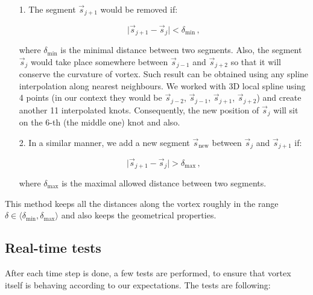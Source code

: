 \begin{itemize}
	\item[1.] The segment $\vec{s}_{j+1}$ would be removed if:

	\begin{equation}
	\vert \vec{s}_{j+1} - \vec{s}_j \vert < \delta_{\text{min}}\,,
	\end{equation}

	where $\delta_{\text{min}}$ is the minimal distance between two segments. Also, the segment $\vec{s}_j$ would take place somewhere between $\vec{s}_{j-1}$ and $\vec{s}_{j+2}$ so that it will conserve the curvature of vortex. Such result can be obtained using any spline interpolation along nearest neighbours. We worked with 3D local spline using 4 points (in our context they would be $\vec{s}_{j-2}$, $\vec{s}_{j-1}$, $\vec{s}_{j+1}$, $\vec{s}_{j+2}$) and create another 11 interpolated knots.
	Consequently, the new position of $\vec{s}_j$ will sit on the 6-th (the middle one) knot and also.

	\item[2.] In a similar manner, we add a new segment $\vec{s}_{\text{new}}$ between $\vec{s}_{j}$ and $\vec{s}_{j+1}$ if:

	\begin{equation}
	\vert \vec{s}_{j+1} - \vec{s}_j \vert > \delta_{\text{max}}\,,
	\end{equation}

	where $\delta_{\text{max}}$ is the maximal allowed distance between two segments.
\end{itemize}

This method keeps all the distances along the vortex roughly in the range $\delta \in \langle \delta_{\text{min}}, \delta_{\text{max}} \rangle$ and also keeps the geometrical properties.

\subsection*{Real-time tests}

After each time step is done, a few tests are performed, to ensure that vortex itself is behaving according to our expectations. The tests are following:

